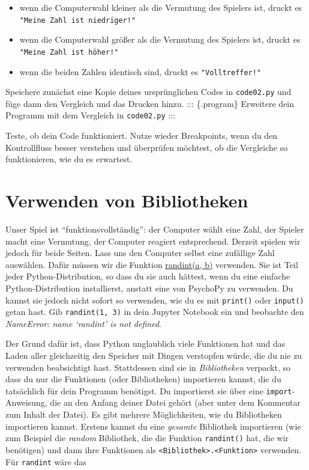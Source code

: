 \documentclass[
]{book}
\providecommand{\tightlist}{%
  \setlength{\itemsep}{0pt}\setlength{\parskip}{0pt}}
\begin{document}
\begin{itemize}
\tightlist
\item
  wenn die Computerwahl kleiner als die Vermutung des Spielers ist, druckt es \texttt{"Meine\ Zahl\ ist\ niedriger!"}
\item
  wenn die Computerwahl größer als die Vermutung des Spielers ist, druckt es \texttt{"Meine\ Zahl\ ist\ höher!"}
\item
  wenn die beiden Zahlen identisch sind, druckt es \texttt{"Volltreffer!"}
\end{itemize}

Speichere zunächst eine Kopie deines ursprünglichen Codes in \texttt{code02.py} und füge dann den Vergleich und das Drucken hinzu.
::: \{.program\}
Erweitere dein Programm mit dem Vergleich in \texttt{code02.py}
:::

Teste, ob dein Code funktioniert. Nutze wieder Breakpoints, wenn du den Kontrollfluss besser verstehen und überprüfen möchtest, ob die Vergleiche so funktionieren, wie du es erwartest.

\hypertarget{using-libraries}{%
\section{Verwenden von Bibliotheken}\label{using-libraries}}

Unser Spiel ist ``funktionsvollständig'': der Computer wählt eine Zahl, der Spieler macht eine Vermutung, der Computer reagiert entsprechend. Derzeit spielen wir jedoch für beide Seiten. Lass uns den Computer selbst eine zufällige Zahl auswählen. Dafür müssen wir die Funktion \href{https://docs.python.org/3/library/random.html\#random.randint}{randint(a, b)} verwenden. Sie ist Teil jeder Python-Distribution, so dass du sie auch hättest, wenn du eine einfache Python-Distribution installierst, anstatt eine von PsychoPy zu verwenden. Du kannst sie jedoch nicht sofort so verwenden, wie du es mit \texttt{print()} oder \texttt{input()} getan hast. Gib \texttt{randint(1,\ 3)} in dein Jupyter Notebook ein und beobachte den \emph{NameError: name `randint' is not defined}.

Der Grund dafür ist, dass Python unglaublich viele Funktionen hat und das Laden aller gleichzeitig den Speicher mit Dingen verstopfen würde, die du nie zu verwenden beabsichtigt hast. Stattdessen sind sie in \emph{Bibliotheken} verpackt, so dass du nur die Funktionen (oder Bibliotheken) importieren kannst, die du tatsächlich für dein Programm benötigst. Du importierst sie über eine \texttt{import}-Anweisung, die an den Anfang deiner Datei gehört (aber unter dem Kommentar zum Inhalt der Datei). Es gibt mehrere Möglichkeiten, wie du Bibliotheken importieren kannst. Erstens kannst du eine \emph{gesamte} Bibliothek importieren (wie zum Beispiel die \emph{random} Bibliothek, die die Funktion \texttt{randint()} hat, die wir benötigen) und dann ihre Funktionen als \texttt{\textless{}Bibliothek\textgreater{}.\textless{}Funktion\textgreater{}} verwenden. Für \texttt{randint} wäre das
\end{document}
